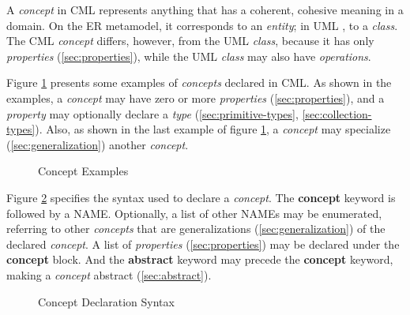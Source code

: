 \begin{definition}
A \emph{concept} in CML represents anything
that has a coherent, cohesive meaning in a domain.
On the ER \cite{er} metamodel,
it corresponds to an \emph{entity};
in UML \cite{uml},
to a \emph{class}.
The CML \emph{concept} differs, however, from the UML \emph{class},
because it has only \emph{properties} (\ref{sec:properties}),
while the UML \emph{class} may also have \emph{operations}.
\end{definition}

\begin{examples}
Figure \ref{fig:ex:concepts} presents some examples of \emph{concepts} declared in CML.
As shown in the examples,
a \emph{concept} may have zero or more \emph{properties}
(\ref{sec:properties}),
and a \emph{property} may optionally declare a \emph{type}
(\ref{sec:primitive-types}, \ref{sec:collection-types}).
Also, as shown in the last example of figure \ref{fig:ex:concepts},
a \emph{concept} may specialize
(\ref{sec:generalization})
another \emph{concept}.
\end{examples}

\begin{figure}
\verbatimfont{\small}
\begin{framed}

\end{framed}
\caption{Concept Examples}
\label{fig:ex:concepts}
\end{figure}

\begin{concrete-syntax}
Figure \ref{fig:stx:concept} specifies the syntax used
to declare a \emph{concept}.
The \textbf{concept} keyword is followed by a NAME.
Optionally, a list of other NAMEs may be enumerated,
referring to other \emph{concepts}
that are generalizations (\ref{sec:generalization}) of the declared \emph{concept}.
A list of \emph{properties} (\ref{sec:properties}) may be declared under the \textbf{concept} block.
And the \textbf{abstract} keyword may precede the \textbf{concept} keyword, making a \emph{concept} abstract (\ref{sec:abstract}).
\end{concrete-syntax}

\begin{figure}
\verbatimfont{\small}
\begin{framed}

\end{framed}
\caption{Concept Declaration Syntax}
\label{fig:stx:concept}
\end{figure}

